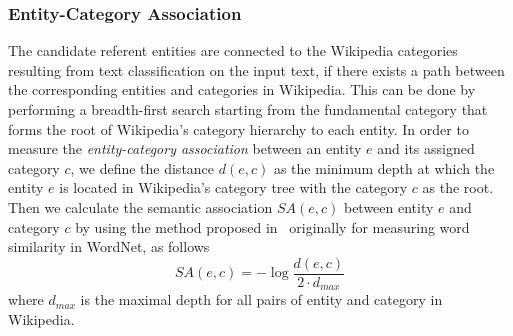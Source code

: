 \subsubsection{Entity-Category Association}
The candidate referent entities are connected to the Wikipedia categories resulting from text classification on the input text, if there exists a path between the corresponding entities and categories in Wikipedia. This can be done by performing a breadth-first search starting from the fundamental category that forms the root of Wikipedia’s category hierarchy to each entity. In order to measure the \emph{entity-category association} between an entity $e$ and its assigned category $c$, we define the distance $d(e,c)$ as the minimum depth at which the entity $e$ is located in Wikipedia’s category tree with the category $c$ as the root.  Then we calculate the semantic association $SA(e,c)$ between entity $e$ and category $c$ by using the method proposed in~\cite{leacock1998combining} originally for measuring word similarity in WordNet, as follows 
\begin{equation}\label{anno_salient:SA}
SA(e,c)=-\log\frac{d(e,c)}{2\cdot d_{max}}
\end{equation}
where $d_{max}$ is the maximal depth for all pairs of entity and category in Wikipedia.



 
